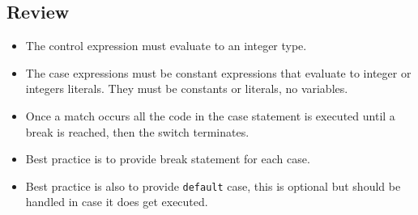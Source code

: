 \subsection{Review}
\begin{itemize}
    \item The control expression must evaluate to an integer type.
    \item The case expressions must be constant expressions that evaluate to integer or integers literals. They must be constants or literals, no variables.
    \item Once a match occurs all the code in the case statement is executed until a break is reached, then the switch terminates.
    \item Best practice is to provide break statement for each case.
    \item Best practice is also to provide \texttt{default} case, this is optional but should be handled in case it does get executed.
\end{itemize}

